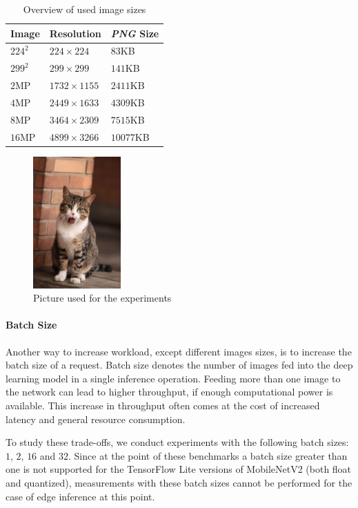 \begin{table}[!htb]
\centering
\caption{Overview of used image sizes}
\label{table:imagesOverview}
\begin{tabular}{@{}lll@{}}
\toprule
Image   & Resolution       & \emph{PNG} Size  \\ \midrule
$224^2$ & $224\times224$   & $83$KB    \\
$299^2$ & $299\times299$   & $141$KB   \\
$2$MP   & $1732\times1155$ & $2411$KB  \\
$4$MP   & $2449\times1633$ & $4309$KB  \\
$8$MP   & $3464\times2309$ & $7515$KB  \\
$16$MP  & $4899\times3266$ & $10077$KB \\ \bottomrule
\end{tabular}
\end{table}
\begin{figure}[!htb]
\centering
\includegraphics[width=0.3\textwidth]{./Bilder/European_cat_compressed.jpg}
\caption{Picture used for the experiments \cite{cat}}
\label{fig:cat}
\end{figure}
\paragraph{Batch Size}
Another way to increase workload, except different images sizes, is to increase the batch size of a request.
Batch size denotes the number of images fed into the deep learning model in a single inference operation. 
Feeding more than one image to the network can lead to higher throughput, if enough computational power is available. This increase in throughput often comes at the cost of increased latency and general resource consumption.

To study these trade-offs, we conduct experiments with the following batch sizes: $1$, $2$, $16$ and $32$. Since at the point of these benchmarks a batch size greater than one is not supported for the TensorFlow Lite versions of MobileNetV2 (both float and quantized), measurements with these batch sizes cannot be performed for the case of edge inference at this point.

